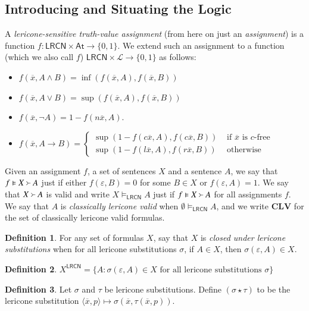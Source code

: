 \documentclass{amsart}
\theoremstyle{definition}
\newtheorem{mdef}{Definition}
\newcommand{\LL}{\mathcal{L}}
\newcommand{\At}{\mathsf{At}}
\newcommand{\LRCN}{\mathsf{LRCN}}
\newcommand{\CLV}{\mathbf{CLV}}
\newcommand{\lrcnclose}[1]{#1^{\LRCN}}
\begin{document}
\subsection{Introducing and Situating the Logic}

A \emph{lericone-sensitive truth-value assignment} (from here on just an \textit{assignment}) is a function $f:\LRCN\times\At\longrightarrow\{0,1\}$. We extend such an assignment to a function (which we also call $f$) $\LRCN\times\LL\longrightarrow\{0,1\}$ as follows:
\begin{itemize}
    \item $f(\overline{x},A\land B)=\inf(f(\overline{x},A), f(\overline{x},B))$
    \item $f(\overline{x},A\lor B)=\sup(f(\overline{x},A), f(\overline{x},B))$
    \item $f(\overline{x},\neg A)=1-f(n\overline{x},A)$.
    \item $f(\overline{x},A\to B)=\left\{
        \begin{array}{rl}
            \sup(1-f(c\overline{x},A),f(c\overline{x},B)) & \text{ if $\overline{x}$ is $c$-free}\\
            \sup(1-f(l\overline{x},A),f(r\overline{x},B)) & \text{ otherwise}
        \end{array}
        \right.$
\end{itemize}

Given an assignment $f$, a set of sentences $X$ and a sentence $A$, we say that $f\vDash X\Yright A$ just if either $f(\varepsilon,B)=0$ for some $B\in X$ or $f(\varepsilon,A)=1$. We say that $X\Yright A$ is valid and write $X\vDash_{\LRCN} A$ just if $f\vDash X\Yright A$ for all assignments $f$. We say that $A$ is \emph{classically lericone valid} when $\emptyset\vDash_{\LRCN} A$, and we write $\CLV$ for the set of classically lericone valid formulas. 

\begin{mdef}
    For any set of formulas $X$, say that $X$ is \emph{closed under lericone substitutions} when for all lericone substitutions $\sigma$, if $A\in X$, then $\sigma(\varepsilon,A)\in X$.  
\end{mdef}

\begin{mdef}
    $\lrcnclose{X}=\{A:\sigma(\varepsilon,A)\in X\text{ for all lericone substitutions }\sigma\}$
\end{mdef}

\begin{mdef}
    Let $\sigma$ and $\tau$ be lericone substitutions. Define $(\sigma\star\tau)$ to be the lericone substitution $\langle\overline{x},p\rangle\mapsto\sigma(\overline{x},\tau(\overline{x},p))$. 
\end{mdef}
\end{document}

